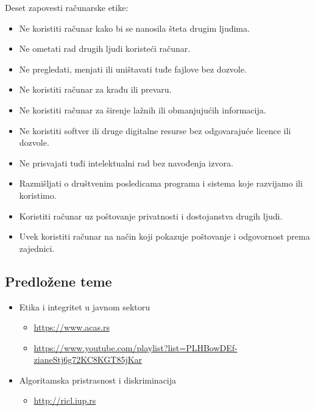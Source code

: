 \documentclass[a4paper, 12pt]{article}
\begin{document}
\newpage
Deset zapovesti računarske etike:
\begin{itemize}
    \item Ne koristiti računar kako bi se nanosila šteta drugim ljudima.
    \item Ne ometati rad drugih ljudi koristeći računar.
    \item Ne pregledati, menjati ili uništavati tuđe fajlove bez dozvole.
    \item Ne koristiti računar za krađu ili prevaru.
    \item Ne koristiti računar za širenje lažnih ili obmanjujućih informacija.
    \item Ne koristiti softver ili druge digitalne resurse bez odgovarajuće licence
    ili dozvole.
    \item Ne prisvajati tuđi intelektualni rad bez navođenja izvora.
    \item Razmišljati o društvenim posledicama programa i sistema koje razvijamo ili
    koristimo.
    \item Koristiti računar uz poštovanje privatnosti i dostojanstva drugih ljudi.
    \item Uvek koristiti računar na način koji pokazuje poštovanje i odgovornost
    prema zajednici.
\end{itemize}

\subsection{Predložene teme}
\begin{itemize}
    \item Etika i integritet u javnom sektoru
    \begin{itemize}
        \item {\href{https://www.acas.rs/storage/page_files/Etika%20i%20integritet%20u%20javnom%20sektoru%20priru%C4%8Dnik%20za%20izvo%C4%91enje%20obuke%20(2015)_1.pdf}{https://www.acas.rs}}
        \item \url{https://www.youtube.com/playlist?list=PLHBowDEf-zianeStj6g72KC8KGT85jKar}
    \end{itemize}
    \item Algoritamska pristrasnost i diskriminacija
    \begin{itemize}
        \item {\href{http://ricl.iup.rs/1693/1/2023%20-%20Uporednopravni%20izazovi%20u%20savremenom%20pravu%20-%20In%20memoriam%20Stefan%20Andonovi%C4%87%20-%20Prlja%20et%20al.pdf}{http://ricl.iup.rs}}
    \end{itemize}
    
\end{itemize}
\end{document}
